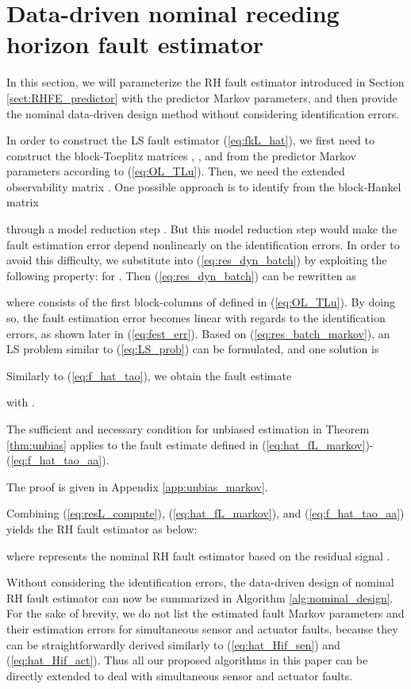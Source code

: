 \documentclass[twocolumn]{autart}
\begin{document}
\section{Data-driven nominal receding horizon fault estimator}\label{sect:RHFE_dd_nominal}
In this section, we will parameterize the RH fault estimator introduced in Section \ref{sect:RHFE_predictor} with the predictor Markov parameters, and then provide the nominal data-driven design method without considering identification errors.

In order to construct the LS fault estimator (\ref{eq:fkL_hat}), we first need to construct the block-Toeplitz matrices , , and  from the predictor Markov parameters according to (\ref{eq:OL_TLu}).
Then, we need the extended observability matrix . One possible approach is to identify  from the block-Hankel matrix

through a model reduction step \cite{Veen2012}. But this model reduction step would make the fault estimation error depend nonlinearly on 
the identification errors. In order to avoid this difficulty, we substitute 
 into (\ref{eq:res_dyn_batch}) by exploiting the following property:
 for .
Then (\ref{eq:res_dyn_batch}) can be rewritten as

where  consists of the first  block-columns of  defined in (\ref{eq:OL_TLu}).
By doing so, the fault estimation error becomes linear with regards to the identification errors, as shown later in (\ref{eq:fest_err}).
Based on (\ref{eq:res_batch_markov}), an LS problem similar to (\ref{eq:LS_prob}) can be formulated, and one solution is

Similarly to (\ref{eq:f_hat_tao}), we obtain the fault estimate

with .


\begin{thm}\label{thm:unbias_markov}
The sufficient and necessary condition for unbiased estimation in Theorem \ref{thm:unbias} applies to the fault estimate defined in (\ref{eq:hat_fL_markov})-(\ref{eq:f_hat_tao_aa}).
\end{thm}

The proof is given in Appendix \ref{app:unbias_markov}.

Combining (\ref{eq:resL_compute}), (\ref{eq:hat_fL_markov}), and (\ref{eq:f_hat_tao_aa}) yields the RH fault estimator as below:

where  represents the nominal RH fault estimator based on the residual signal .


Without considering the identification errors, the data-driven design of nominal RH fault estimator can now be summarized in Algorithm \ref{alg:nominal_design}. For the sake of brevity, we do not list the estimated fault Markov parameters  and their estimation errors for simultaneous sensor and actuator faults, because they can be straightforwardly derived similarly to (\ref{eq:hat_Hif_sen}) and (\ref{eq:hat_Hif_act}). Thus all our proposed algorithms in this paper can be directly extended to deal with simultaneous sensor and actuator faults.
\end{document}
